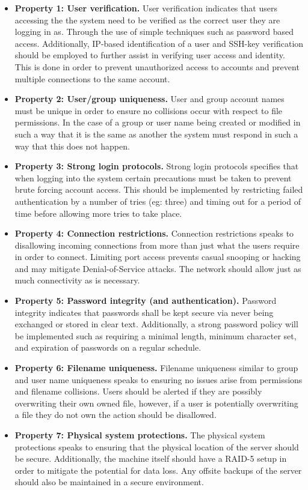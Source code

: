 \documentclass[11pt]{article}
\begin{document}
\begin{itemize}
\item \textbf{Property 1: User verification.} User verification indicates that users accessing the the system need to be verified as the correct user they are logging in as. Through the use of simple techniques such as password based access. Additionally, IP-based identification of a user and SSH-key verification should be employed to further assist in verifying user access and identity. This is done in order to prevent unauthorized access to accounts and prevent multiple connections to the same account.
\item \textbf{Property 2: User/group uniqueness.} User and group account names must be unique in order to ensure no collisions occur with respect to file permissions. In the case of a group or user name being created or modified in such a way that it is the same as another the system must respond in such a way that this does not happen.
\item \textbf{Property 3: Strong login protocols.} Strong login protocols specifies that when logging into the system certain precautions must be taken to prevent brute forcing account access. This should be implemented by restricting failed authentication by a number of tries (eg: three) and timing out for a period of time before allowing more tries to take place.
\item \textbf{Property 4: Connection restrictions.} Connection restrictions speaks to disallowing incoming connections from more than just what the users require in order to connect. Limiting port access prevents casual snooping or hacking and may mitigate Denial-of-Service attacks. The network should allow just as much connectivity as is necessary.  
\item \textbf{Property 5: Password integrity (and authentication).} Password integrity indicates that passwords shall be kept secure via never being exchanged or stored in clear text. Additionally, a strong password policy will be implemented such as requiring a minimal length, minimum character set, and expiration of passwords on a regular schedule.
\item \textbf{Property 6: Filename uniqueness.} Filename uniqueness similar to group and user name uniqueness speaks to ensuring no issues arise from permissions and filename collisions. Users should be alerted if they are possibly overwriting their own owned file, however, if a user is potentially overwriting a file they do not own the action should be disallowed.
\item \textbf{Property 7: Physical system protections.} The physical system protections speaks to ensuring that the physical location of the server should be secure. Additionally, the machine itself should have a RAID-5 setup in order to mitigate the potential for data loss. Any offsite backups of the server should also be maintained in a secure environment.
\end{itemize}
\end{document}
